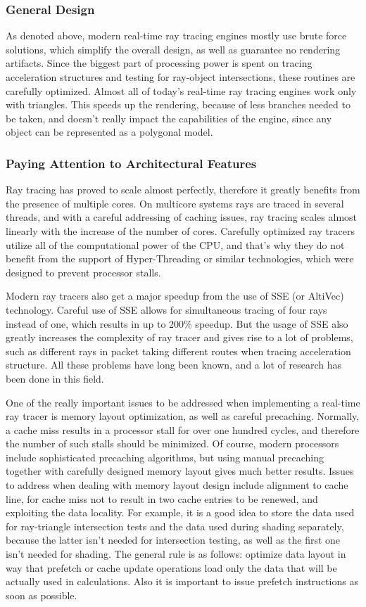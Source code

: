 \documentclass{article}
\begin{document}
\subsubsection{General Design}
As denoted above, modern real-time ray tracing engines mostly use brute force solutions, which simplify the overall design, as well as guarantee no rendering artifacts. Since the biggest part of processing power is spent on tracing acceleration structures and testing for ray-object intersections, these routines are carefully optimized. Almost all of today's real-time ray tracing engines work only with triangles. This speeds up the rendering, because of less branches needed to be taken, and doesn't really impact the capabilities of the engine, since any object can be represented as a polygonal model.

\subsubsection{Paying Attention to Architectural Features}
Ray tracing has proved to scale almost perfectly, therefore it greatly benefits from the presence of multiple cores. On multicore systems rays are traced in several threads, and with a careful addressing of caching issues, ray tracing scales almost linearly with the increase of the number of cores. Carefully optimized ray tracers utilize all of the computational power of the CPU, and that's why they do not benefit from the support of Hyper-Threading or similar technologies, which were designed to prevent processor stalls.

Modern ray tracers also get a major speedup from the use of SSE (or AltiVec) technology. Careful use of SSE allows for simultaneous tracing of four rays instead of one, which results in up to 200\% speedup. But the usage of SSE also greatly increases the complexity of ray tracer and gives rise to a lot of problems, such as different rays in packet taking different routes when tracing acceleration structure. All these problems have long been known, and a lot of research has been done in this field.

One of the really important issues to be addressed when implementing a real-time ray tracer is memory layout optimization, as well as careful precaching. Normally, a cache miss results in a processor stall for over one hundred cycles, and therefore the number of such stalls should be minimized. Of course, modern processors include sophisticated precaching algorithms, but using manual precaching together with carefully designed memory layout gives much better results. Issues to address when dealing with memory layout design include alignment to cache line, for cache miss not to result in two cache entries to be renewed, and exploiting the data locality. For example, it is a good idea to store the data used for ray-triangle intersection tests and the data used during shading separately, because the latter isn't needed for intersection testing, as well as the first one isn't needed for shading. The general rule is as follows: optimize data layout in way that prefetch or cache update operations load only the data that will be actually used in calculations. Also it is important to issue prefetch instructions as soon as possible.
\end{document}
